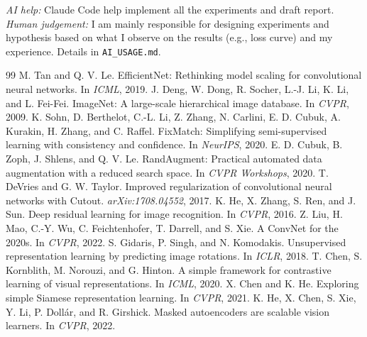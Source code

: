 \documentclass{article}
\begin{document}
\emph{AI help:} Claude Code help implement all the experiments and draft report. \emph{Human judgement:} I am mainly responsible for designing experiments and hypothesis based on what I observe on the results (e.g., loss curve) and my experience. Details in \texttt{AI\_USAGE.md}.


{\small
\begin{thebibliography}{99}
\setlength{\itemsep}{0pt}
 M. Tan and Q. V. Le. EfficientNet: Rethinking model scaling for convolutional neural networks. In \emph{ICML}, 2019.
 J. Deng, W. Dong, R. Socher, L.-J. Li, K. Li, and L. Fei-Fei. ImageNet: A large-scale hierarchical image database. In \emph{CVPR}, 2009.
 K. Sohn, D. Berthelot, C.-L. Li, Z. Zhang, N. Carlini, E. D. Cubuk, A. Kurakin, H. Zhang, and C. Raffel. FixMatch: Simplifying semi-supervised learning with consistency and confidence. In \emph{NeurIPS}, 2020.
 E. D. Cubuk, B. Zoph, J. Shlens, and Q. V. Le. RandAugment: Practical automated data augmentation with a reduced search space. In \emph{CVPR Workshops}, 2020.
 T. DeVries and G. W. Taylor. Improved regularization of convolutional neural networks with Cutout. \emph{arXiv:1708.04552}, 2017.
 K. He, X. Zhang, S. Ren, and J. Sun. Deep residual learning for image recognition. In \emph{CVPR}, 2016.
 Z. Liu, H. Mao, C.-Y. Wu, C. Feichtenhofer, T. Darrell, and S. Xie. A ConvNet for the 2020s. In \emph{CVPR}, 2022.
 S. Gidaris, P. Singh, and N. Komodakis. Unsupervised representation learning by predicting image rotations. In \emph{ICLR}, 2018.
 T. Chen, S. Kornblith, M. Norouzi, and G. Hinton. A simple framework for contrastive learning of visual representations. In \emph{ICML}, 2020.
 X. Chen and K. He. Exploring simple Siamese representation learning. In \emph{CVPR}, 2021.
 K. He, X. Chen, S. Xie, Y. Li, P. Doll\'ar, and R. Girshick. Masked autoencoders are scalable vision learners. In \emph{CVPR}, 2022.
\end{thebibliography}
}
\end{document}
